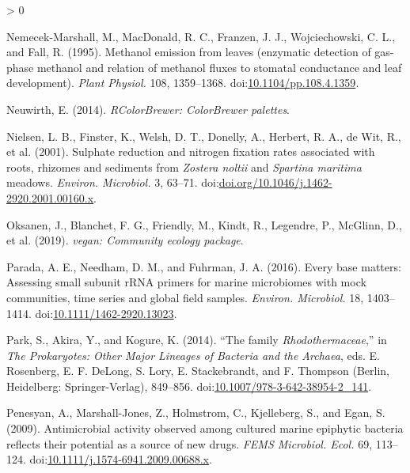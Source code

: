 \documentclass[
  12pt,
]{article}
\newlength{\cslhangindent}
\newenvironment{CSLReferences}[2] %
 {%
  \setlength{\parindent}{0pt}
  \ifodd #1 \everypar{\setlength{\hangindent}{\cslhangindent}}\ignorespaces\fi
  \ifnum #2 > 0
  \setlength{\parskip}{#2\baselineskip}
  \fi
 }%
 {}
\begin{document}
\begin{CSLReferences}{1}{0}
\leavevmode\hypertarget{ref-Nemecek-Marshall1995}{}%
Nemecek-Marshall, M., MacDonald, R. C., Franzen, J. J., Wojciechowski,
C. L., and Fall, R. (1995). Methanol emission from leaves (enzymatic
detection of gas-phase methanol and relation of methanol fluxes to
stomatal conductance and leaf development). \emph{Plant Physiol.} 108,
1359--1368.
doi:\href{https://doi.org/10.1104/pp.108.4.1359}{10.1104/pp.108.4.1359}.

\leavevmode\hypertarget{ref-Neuwirth2014}{}%
Neuwirth, E. (2014). \emph{{RColorBrewer}: {ColorBrewer} palettes}.

\leavevmode\hypertarget{ref-Nielsen2001}{}%
Nielsen, L. B., Finster, K., Welsh, D. T., Donelly, A., Herbert, R. A.,
de Wit, R., et al. (2001). Sulphate reduction and nitrogen fixation
rates associated with roots, rhizomes and sediments from {\emph{Zostera
noltii}} and {\emph{Spartina maritima}} meadows. \emph{Environ.
Microbiol.} 3, 63--71.
doi:\href{https://doi.org/doi.org/10.1046/j.1462-2920.2001.00160.x}{doi.org/10.1046/j.1462-2920.2001.00160.x}.

\leavevmode\hypertarget{ref-Oksanen2019}{}%
Oksanen, J., Blanchet, F. G., Friendly, M., Kindt, R., Legendre, P.,
McGlinn, D., et al. (2019). \emph{{vegan}: Community ecology package}.

\leavevmode\hypertarget{ref-Parada2016}{}%
Parada, A. E., Needham, D. M., and Fuhrman, J. A. (2016). Every base
matters: Assessing small subunit {rRNA} primers for marine microbiomes
with mock communities, time series and global field samples.
\emph{Environ. Microbiol.} 18, 1403--1414.
doi:\href{https://doi.org/10.1111/1462-2920.13023}{10.1111/1462-2920.13023}.

\leavevmode\hypertarget{ref-Park2014}{}%
Park, S., Akira, Y., and Kogure, K. (2014). {``The family
{\emph{Rhodothermaceae}},''} in \emph{The {Prokaryotes}: {Other Major
Lineages} of {Bacteria} and the {Archaea}}, eds. E. Rosenberg, E. F.
DeLong, S. Lory, E. Stackebrandt, and F. Thompson ({Berlin, Heidelberg}:
{Springer-Verlag}), 849--856.
doi:\href{https://doi.org/10.1007/978-3-642-38954-2_141}{10.1007/978-3-642-38954-2\_141}.

\leavevmode\hypertarget{ref-Penesyan2009}{}%
Penesyan, A., Marshall-Jones, Z., Holmstrom, C., Kjelleberg, S., and
Egan, S. (2009). Antimicrobial activity observed among cultured marine
epiphytic bacteria reflects their potential as a source of new drugs.
\emph{FEMS Microbiol. Ecol.} 69, 113--124.
doi:\href{https://doi.org/10.1111/j.1574-6941.2009.00688.x}{10.1111/j.1574-6941.2009.00688.x}.


\end{CSLReferences}
\end{document}

